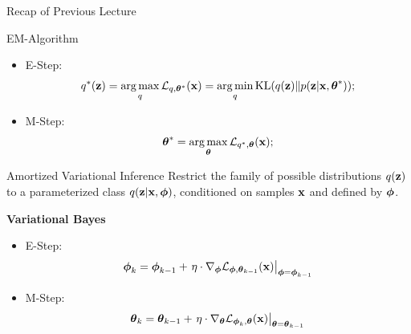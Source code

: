 \documentclass{beamer}
\begin{document}
\begin{frame}
	\titlepage
	\resetonslide
\end{frame}
\begin{frame}{Recap of Previous Lecture}
	\begin{block}{EM-Algorithm}
	\begin{itemize}
		\item E-Step:
		\[
			q^*(\mathbf{z}) = \operatorname*{arg\,max}_q \mathcal{L}_{q, \boldsymbol{\theta}^*}(\mathbf{x})
			= \operatorname*{arg\,min}_q \mathrm{KL}(q(\mathbf{z}) \| p(\mathbf{z} | \mathbf{x}, \boldsymbol{\theta}^*));
		\]
		\item M-Step:
		\[
			\boldsymbol{\theta}^* = \operatorname*{arg\,max}_{\boldsymbol{\theta}} \mathcal{L}_{q^*, \boldsymbol{\theta}}(\mathbf{x});
		\]
	\end{itemize}
	\end{block}
	\vspace{-0.5cm}
	\begin{block}{Amortized Variational Inference}
	Restrict the family of possible distributions $q(\mathbf{z})$ to a parameterized class $q(\mathbf{z}|\mathbf{x}, \boldsymbol{\phi})$, conditioned on samples $\mathbf{x}$ and defined by $\boldsymbol{\phi}$.
	\end{block}
	\textbf{Variational Bayes}
	\begin{itemize}
		\item E-Step:
		\[
			\boldsymbol{\phi}_k = \boldsymbol{\phi}_{k-1} + \left.\eta \cdot \nabla_{\boldsymbol{\phi}} \mathcal{L}_{\boldsymbol{\phi}, \boldsymbol{\theta}_{k-1}}(\mathbf{x})\right|_{\boldsymbol{\phi}=\boldsymbol{\phi}_{k-1}}
		\]
		\item M-Step:
		\[
			\boldsymbol{\theta}_k = \boldsymbol{\theta}_{k-1} + \left.\eta \cdot \nabla_{\boldsymbol{\theta}} \mathcal{L}_{\boldsymbol{\phi}_k, \boldsymbol{\theta}}(\mathbf{x})\right|_{\boldsymbol{\theta}=\boldsymbol{\theta}_{k-1}}
		\]
	\end{itemize}
\end{frame}
\end{document}
